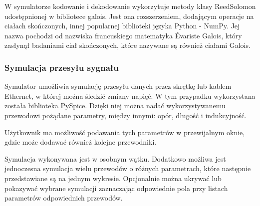 W symulatorze kodowanie i dekodowanie wykorzytuje metody klasy ReedSolomon udostępnionej w bibliotece galois. Jest ona rozszerzeniem, dodającym operacje na ciałach skończonych, innej popularnej biblioteki języka Python - NumPy. Jej nazwa pochodzi od nazwiska francuskiego matematyka Évariste Galois, który zasłynął badaniami ciał skończonych, które nazywane są również ciałami Galois.

\subsubsection{Symulacja przesyłu sygnału}
Symulator umożliwia symulację przesyłu danych przez skrętkę lub kablem Ethernet, w której można śledzić zmiany napięć. W tym przypadku wykorzystana została biblioteka PySpice. Dzięki niej można nadać wykorzystywanemu przewodowi pożądane parametry, między innymi: opór, długość i indukcyjność.

Użytkownik ma możliwość podawania tych parametrów w przewijalnym oknie, gdzie może dodawać również kolejne przewodniki.

Symulacja wykonywana jest w osobnym wątku. Dodatkowo możliwa jest jednoczesna symulacja wielu przewodów o różnych parametrach, które następnie przedstawiane są na jednym wykresie. Opcjonalnie można ukrywać lub pokazywać wybrane symulacji zaznaczając odpowiednie pola przy listach parametrów odpowiednich przewodów.
